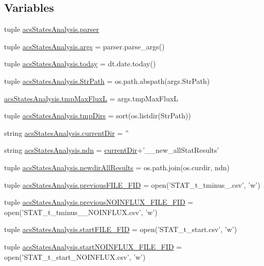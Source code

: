 \subsection*{Variables}
\begin{DoxyCompactItemize}
\item 
tuple \hyperlink{a00130_ac24ead92a86e25ec9213d8c7253d4b60}{acs\-States\-Analysis.\-parser}
\item 
tuple \hyperlink{a00130_a4912a255d0be60fffea119e6bd92b6e4}{acs\-States\-Analysis.\-args} = parser.\-parse\-\_\-args()
\item 
tuple \hyperlink{a00130_ac99ee9d8196d8a2305b9f4c795b23b97}{acs\-States\-Analysis.\-today} = dt.\-date.\-today()
\item 
tuple \hyperlink{a00130_ac34f3f43f888eb6620266d78ce928ceb}{acs\-States\-Analysis.\-Str\-Path} = os.\-path.\-abspath(args.\-Str\-Path)
\item 
\hyperlink{a00130_a22a52c6b87e96dc826bc621ee88c380a}{acs\-States\-Analysis.\-tmp\-Max\-Flux\-L} = args.\-tmp\-Max\-Flux\-L
\item 
tuple \hyperlink{a00130_ab71c19ee20acae0f07934a8d0e9fe50b}{acs\-States\-Analysis.\-tmp\-Dirs} = sort(os.\-listdir(Str\-Path))
\item 
string \hyperlink{a00130_ae98225d5c8c20399f5c3b888fa37746f}{acs\-States\-Analysis.\-current\-Dir} = ''
\item 
string \hyperlink{a00130_a5e117df6e0cdffdae13947622c6c4890}{acs\-States\-Analysis.\-ndn} = \hyperlink{a00031_af32eb97339f1e9d37b5540de2cbc79c9}{current\-Dir}+'\-\_\-\_\-new\-\_\-all\-Stat\-Results'
\item 
tuple \hyperlink{a00130_a62d6cfd52b4428ab7ea4d75d43b2d49b}{acs\-States\-Analysis.\-newdir\-All\-Results} = os.\-path.\-join(os.\-curdir, ndn)
\item 
tuple \hyperlink{a00130_aba65725a1bd6d1b891b02dc7f3db2335}{acs\-States\-Analysis.\-previous\-F\-I\-L\-E\-\_\-\-F\-I\-D} = open('S\-T\-A\-T\-\_\-t\-\_\-tminus\-\_.\-csv', 'w')
\item 
tuple \hyperlink{a00130_a9f9485bf6f7a3734bbd110b756005b71}{acs\-States\-Analysis.\-previous\-N\-O\-I\-N\-F\-L\-U\-X\-\_\-\-F\-I\-L\-E\-\_\-\-F\-I\-D} = open('S\-T\-A\-T\-\_\-t\-\_\-tminus\-\_\-\_\-\-N\-O\-I\-N\-F\-L\-U\-X.\-csv', 'w')
\item 
tuple \hyperlink{a00130_a0239a9dcc4900463a0c19557bec23521}{acs\-States\-Analysis.\-start\-F\-I\-L\-E\-\_\-\-F\-I\-D} = open('S\-T\-A\-T\-\_\-t\-\_\-start.\-csv', 'w')
\item 
tuple \hyperlink{a00130_a44f4f158af9771fbabbbacc4f4484d32}{acs\-States\-Analysis.\-start\-N\-O\-I\-N\-F\-L\-U\-X\-\_\-\-F\-I\-L\-E\-\_\-\-F\-I\-D} = open('S\-T\-A\-T\-\_\-t\-\_\-start\-\_\-\-N\-O\-I\-N\-F\-L\-U\-X.\-csv', 'w')

\end{DoxyCompactItemize}
